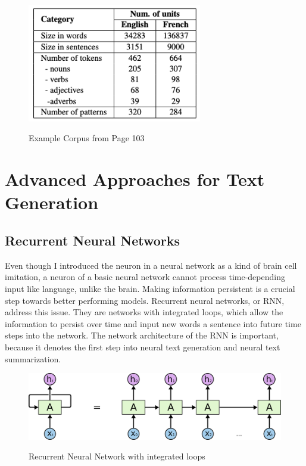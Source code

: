 \begin{figure}
	\begin{center}
		\includegraphics[width=3in]{photos/corpus}\\
		\caption{Example Corpus from \cite{elena} Page 103}\label{corpus}
	\end{center}
\end{figure}

\section{Advanced Approaches for Text Generation}\label{ss:aatg}
\subsection{Recurrent Neural Networks}\label{ss:rnn}
Even though I introduced the neuron in a neural network as a kind of brain cell imitation, a neuron of a basic neural network cannot process time-depending input like language, unlike the brain. Making information persistent is a crucial step towards better performing models. Recurrent neural networks, or RNN, address this issue. They are networks with integrated loops, which allow the information to persist over time and input new words a sentence into future time steps into the network\cite{olah}. The network architecture of the RNN is important, because it denotes the first step into neural text generation and neural text summarization. 

\begin{figure}
	\begin{center}
		\includegraphics[width=4.5in]{photos/RNN-unrolled}\\
		\caption{Recurrent Neural Network with integrated loops \cite{olah}}\label{rnn}
	\end{center}
\end{figure}


